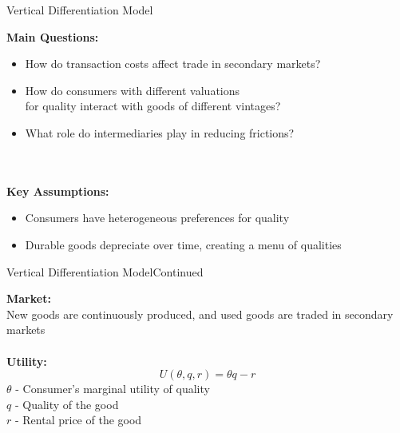 \documentclass[aspectratio=169]{beamer}  %
\begin{document}
\begin{frame}{Vertical Differentiation Model}{}

\begin{spacing}{1.5}
{\small

 \textbf{Main Questions:}
    \begin{itemize}
        \item How do transaction costs affect trade in secondary markets?
        \item How do consumers with different valuations\\ for quality interact with goods of different vintages?
        \item What role do intermediaries play in reducing frictions?
    \end{itemize}\\
    \quad\\
\textbf{Key Assumptions:}
    \begin{itemize}
        \item Consumers have heterogeneous preferences for quality
        \item Durable goods depreciate over time, creating a menu of qualities
    \end{itemize}
    }
\end{spacing}
\end{frame}


\begin{frame}{Vertical Differentiation Model}{Continued}
\begin{spacing}{1.5}
{\small

    \textbf{Market:}\\
    New goods are continuously produced, and used goods are traded in secondary markets\\
\quad \\
    \textbf{Utility:}
    $$U(\theta, q, r) = \theta q - r$$
 $\theta$ \quad - Consumer's marginal utility of quality\\
  $q$ \quad - Quality of the good\\
 $r$ \quad - Rental price of the good\\

    }
\end{spacing}
\end{frame}
\end{document}
